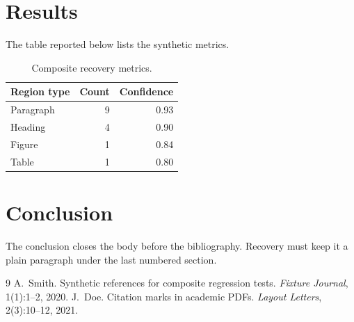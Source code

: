 \documentclass[11pt,a4paper]{article}
\begin{document}
\section{Results}
The table reported below lists the synthetic metrics.

\begin{table}[htbp]
  \centering
  \begin{tabular}{lrr}
    \toprule
    Region type & Count & Confidence \\
    \midrule
    Paragraph   & 9     & 0.93       \\
    Heading     & 4     & 0.90       \\
    Figure      & 1     & 0.84       \\
    Table       & 1     & 0.80       \\
    \bottomrule
  \end{tabular}
  \caption{Composite recovery metrics.}
\end{table}

\section{Conclusion}
The conclusion closes the body before the bibliography. Recovery must
keep it a plain paragraph under the last numbered section.

\begin{thebibliography}{9}
  A.~Smith.
  Synthetic references for composite regression tests.
  \emph{Fixture Journal}, 1(1):1--2, 2020.
  J.~Doe.
  Citation marks in academic PDFs.
  \emph{Layout Letters}, 2(3):10--12, 2021.
\end{thebibliography}
\end{document}
